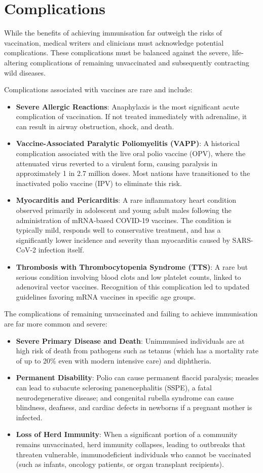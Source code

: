 \section*{Complications}
While the benefits of achieving immunisation far outweigh the risks of vaccination, medical writers and clinicians must acknowledge potential complications. These complications must be balanced against the severe, life-altering complications of remaining unvaccinated and subsequently contracting wild diseases.

Complications associated with vaccines are rare and include:
\begin{itemize}
    \item \textbf{Severe Allergic Reactions}: Anaphylaxis is the most significant acute complication of vaccination. If not treated immediately with adrenaline, it can result in airway obstruction, shock, and death.
    \item \textbf{Vaccine-Associated Paralytic Poliomyelitis (VAPP)}: A historical complication associated with the live oral polio vaccine (OPV), where the attenuated virus reverted to a virulent form, causing paralysis in approximately 1 in 2.7 million doses. Most nations have transitioned to the inactivated polio vaccine (IPV) to eliminate this risk.
    \item \textbf{Myocarditis and Pericarditis}: A rare inflammatory heart condition observed primarily in adolescent and young adult males following the administration of mRNA-based COVID-19 vaccines. The condition is typically mild, responds well to conservative treatment, and has a significantly lower incidence and severity than myocarditis caused by SARS-CoV-2 infection itself.
    \item \textbf{Thrombosis with Thrombocytopenia Syndrome (TTS)}: A rare but serious condition involving blood clots and low platelet counts, linked to adenoviral vector vaccines. Recognition of this complication led to updated guidelines favoring mRNA vaccines in specific age groups.
\end{itemize}

The complications of remaining unvaccinated and failing to achieve immunisation are far more common and severe:
\begin{itemize}
    \item \textbf{Severe Primary Disease and Death}: Unimmunised individuals are at high risk of death from pathogens such as tetanus (which has a mortality rate of up to 20\% even with modern intensive care) and diphtheria.
    \item \textbf{Permanent Disability}: Polio can cause permanent flaccid paralysis; measles can lead to subacute sclerosing panencephalitis (SSPE), a fatal neurodegenerative disease; and congenital rubella syndrome can cause blindness, deafness, and cardiac defects in newborns if a pregnant mother is infected.
    \item \textbf{Loss of Herd Immunity}: When a significant portion of a community remains unvaccinated, herd immunity collapses, leading to outbreaks that threaten vulnerable, immunodeficient individuals who cannot be vaccinated (such as infants, oncology patients, or organ transplant recipients).
\end{itemize}

